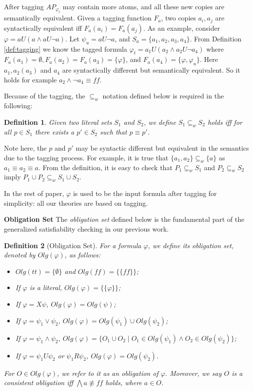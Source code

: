 \documentclass[conference]{IEEEtran}
\newtheorem{definition}{Definition}
\def\olg#1{\mathit{Olg}(#1)}
\def\phi{\varphi}
\def\ff{\mathit{ff}}
\def\tt{\mathit{tt}}
\begin{document}
After tagging $AP_{\phi_t}$ may contain more atoms, and 
all these new copies are semantically equivalent. Given a tagging
function $F_a$, two copies $a_i,a_j$ are syntactically equivalent iff
$F_a(a_i)=F_a(a_j)$.
As an example, consider $\phi = a U (a \wedge a U \neg a)$. Let
$\psi_{u}=a U \neg a$, and $S_a=\{a_1,a_2,a_3,a_4\}$.  From Definition
\ref{def:tagging} we know the tagged formula $\phi_t=a_1U(a_2\wedge a_2 U\neg a_4)$ 
where $F_a(a_1)=\emptyset,F_a(a_2)=F_a(a_3)=\{\phi\}$, and
$F_a(a_4)=\{\phi,\phi_u\}$. 
Here $a_1,a_2(a_3)$ and $a_4$ are syntactically different but semantically equivalent.
So it holds for example $a_2\wedge\neg a_4\equiv\ff$. 

Because of the tagging, the $\subseteq_w$ 
notation defined below is required in the following:


\begin{definition}\label{def:subseteqw}
  Given two literal sets $S_1$ and $S_2$, we define $S_1\subseteq_w S_2$ holds iff for all 
  $p\in S_1$ there exists a $p'\in S_2$ such that $p\equiv p'$.
\end{definition}
Note here, the $p$ and $p'$ may be syntactic different but equivalent 
in the semantics due to the tagging process. For example, it is true that 
$\{a_1,a_2\}\subseteq_w \{a\}$ as $a_1\equiv a_2\equiv a$. From the definition, it is easy to check 
that $P_1\subseteq_w S_1$ and $P_2\subseteq_w S_2$ imply 
$P_1\cup P_2\subseteq_w S_1\cup S_2$.


In the rest of paper, $\phi$ is used to be the input formula after tagging for simplicity: all our theories are based on tagging. 

\fi

\noindent
\textbf{Obligation Set} The \textit{obligation set} defined below is the fundamental part of the generalized satisfiability checking in our previous work. 


\begin{definition}[Obligation Set]\label{def:os}
  For a formula $\phi$, we define its obligation set, denoted by
  $\olg{\phi}$, as follows:
  \begin{itemize}
  \item $\olg{\tt}=\{\emptyset\}$ and $\olg{\ff}=\{\{\ff\}\}$;
   \item If $\phi$ is a literal, $\olg{\phi}=\{ \{\phi\}\}$;
    \item If $\phi=X\psi$, $\olg{\phi}=\olg{\psi}$;
    \item If $\phi=\psi_1\vee\psi_2$, $\olg{\phi}=\olg{\psi_1}\cup \olg{\psi_2}$;
    \item If $\phi=\psi_1\wedge\psi_2$, $\olg{\phi}=\{O_1\cup O_2 \mid O_1\in \olg{\psi_1}\wedge O_2\in \olg{\psi_2}\}$;
    \item If $\phi=\psi_1 U\psi_2$ or $\psi_1 R\psi_2$, $\olg{\phi}=\olg{\psi_2}$.
 \end{itemize}
 For $O\in \olg{\phi}$, we refer to it as an \emph{obligation} of
 $\phi$. Moreover, we say $O$ is a consistent obligation iff $\bigwedge a\not\equiv\ff$ holds, 
 where $a\in O$.
\end{definition}
\end{document}
